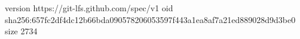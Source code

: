 version https://git-lfs.github.com/spec/v1
oid sha256:657fc2df4dc12b66bda090578206053597f443a1ea8af7a21ed889028d9d3be0
size 2734
